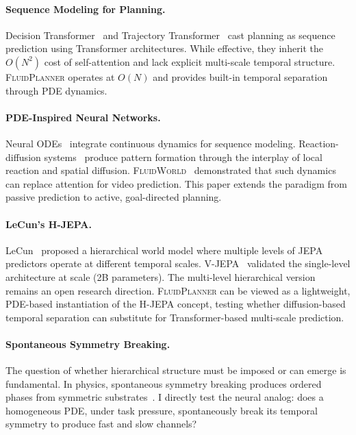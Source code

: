 \documentclass{article}
\newcommand{\fluidplanner}{\textsc{FluidPlanner}}
\newcommand{\fluidworld}{\textsc{FluidWorld}}
\begin{document}
\paragraph{Sequence Modeling for Planning.}
Decision Transformer~\cite{chen2021decisiontransformer} and Trajectory Transformer~\cite{janner2021trajectory} cast planning as sequence prediction using Transformer architectures. While effective, they inherit the $O(N^2)$ cost of self-attention and lack explicit multi-scale temporal structure. \fluidplanner{} operates at $O(N)$ and provides built-in temporal separation through PDE dynamics.

\paragraph{PDE-Inspired Neural Networks.}
Neural ODEs~\cite{chen2022neural} integrate continuous dynamics for sequence modeling. Reaction-diffusion systems~\cite{turing1952chemical,murray2002mathematical} produce pattern formation through the interplay of local reaction and spatial diffusion. \fluidworld{}~\cite{polly2026fluidworld} demonstrated that such dynamics can replace attention for video prediction. This paper extends the paradigm from passive prediction to active, goal-directed planning.

\paragraph{LeCun's H-JEPA.}
LeCun~\cite{lecun2022path} proposed a hierarchical world model where multiple levels of JEPA predictors operate at different temporal scales. V-JEPA~\cite{bardes2024vjepa} validated the single-level architecture at scale (2B parameters). The multi-level hierarchical version remains an open research direction. \fluidplanner{} can be viewed as a lightweight, PDE-based instantiation of the H-JEPA concept, testing whether diffusion-based temporal separation can substitute for Transformer-based multi-scale prediction.

\paragraph{Spontaneous Symmetry Breaking.}
The question of whether hierarchical structure must be imposed or can emerge is fundamental. In physics, spontaneous symmetry breaking produces ordered phases from symmetric substrates~\cite{cross1993pattern}. I directly test the neural analog: does a homogeneous PDE, under task pressure, spontaneously break its temporal symmetry to produce fast and slow channels?
\end{document}
